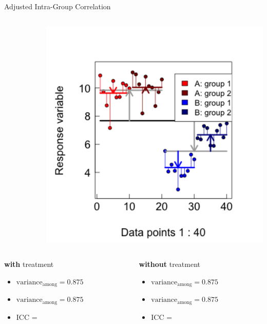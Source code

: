 \documentclass{beamer}
\begin{document}
\begin{frame}{Adjusted Intra-Group Correlation}
\begin{columns}[onlytextwidth]
\begin{column}{0.5\textwidth}
  \end{column}
    \hspace{0.02\textwidth} %
    \begin{column}{0.5\textwidth}
    \scalebox{0.65}{
      
      }
      \centering
        \includegraphics[width=0.999\textwidth]{lectures/day_1_intro_to_mems/figures/unnamed-chunk-36-1.png}
    \end{column}
  \end{columns}

  \begin{columns}[onlytextwidth] 
  \begin{column}{0.5\textwidth}
  \textbf{with} treatment \\
  \begin{itemize}
      \item $\text{variance}_{\text{among}} = 0.875$
      \item $\text{variance}_{\text{among}} = 0.875$ 
      \item ICC =  
  \end{itemize}

  \end{column}
    \hspace{0.02\textwidth} %
    \begin{column}{0.5\textwidth}
    \textbf{without} treatment
    \begin{itemize}
      \item $\text{variance}_{\text{among}} = 0.875$
      \item $\text{variance}_{\text{among}} = 0.875$ 
      \item ICC =   
  \end{itemize}
    \end{column}
  \end{columns}


\end{frame}
\end{document}
